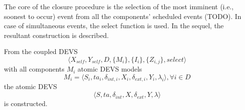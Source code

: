 The core of the closure procedure is the selection of the most imminent (i.e., soonest to occur) event from all the components' 
scheduled events (TODO). In case of simultaneous events, the select function is used. In the sequel, the resultant construction 
is described.

From the coupled DEVS
\begin{equation}
    \langle X_{self}, Y_{self}, D, \{M_i\}, \{I_i\}, \{Z_{i,j}\}, select \rangle
\end{equation}
with all components $M_i$ atomic DEVS models
\begin{equation}
    M_i = \langle S_i, ta_i, \delta_{int, i}, X_i, \delta_{ext, i}, Y_i, \lambda_i \rangle, \forall i \in D
\end{equation}
the atomic DEVS
\begin{equation}
    \langle S, ta, \delta_{int}, X, \delta_{ext}, Y, \lambda \rangle
\end{equation}
is constructed.

